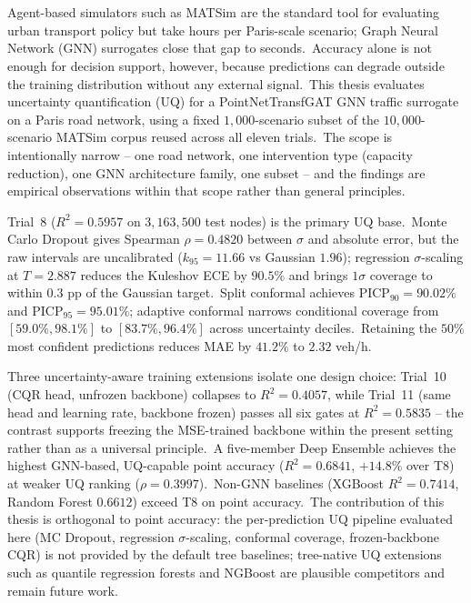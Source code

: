 \chapter{\abstractname}

Agent-based simulators such as MATSim are the standard tool for evaluating urban transport policy but take hours per Paris-scale scenario; Graph Neural Network (GNN) surrogates close that gap to seconds.\ Accuracy alone is not enough for decision support, however, because predictions can degrade outside the training distribution without any external signal.\ This thesis evaluates uncertainty quantification (UQ) for a PointNetTransfGAT GNN traffic surrogate on a Paris road network, using a fixed $1{,}000$-scenario subset of the $10{,}000$-scenario MATSim corpus reused across all eleven trials.\ The scope is intentionally narrow -- one road network, one intervention type (capacity reduction), one GNN architecture family, one subset -- and the findings are empirical observations within that scope rather than general principles.

Trial~8 ($R^2 = 0.5957$ on $3{,}163{,}500$ test nodes) is the primary UQ base.\ Monte Carlo Dropout gives Spearman $\rho = 0.4820$ between $\sigma$ and absolute error, but the raw intervals are uncalibrated ($k_{95} = 11.66$ vs Gaussian $1.96$); regression $\sigma$-scaling at $T = 2.887$ reduces the Kuleshov ECE by $90.5\%$ and brings $1\sigma$ coverage to within $0.3$ pp of the Gaussian target.\ Split conformal achieves $\mathrm{PICP}_{90} = 90.02\%$ and $\mathrm{PICP}_{95} = 95.01\%$; adaptive conformal narrows conditional coverage from $[59.0\%, 98.1\%]$ to $[83.7\%, 96.4\%]$ across uncertainty deciles.\ Retaining the $50\%$ most confident predictions reduces MAE by $41.2\%$ to $2.32$ veh/h.

Three uncertainty-aware training extensions isolate one design choice: Trial~10 (CQR head, unfrozen backbone) collapses to $R^2 = 0.4057$, while Trial~11 (same head and learning rate, backbone frozen) passes all six gates at $R^2 = 0.5835$ -- the contrast supports freezing the MSE-trained backbone within the present setting rather than as a universal principle.\ A five-member Deep Ensemble achieves the highest GNN-based, UQ-capable point accuracy ($R^2 = 0.6841$, $+14.8\%$ over T8) at weaker UQ ranking ($\rho = 0.3997$).\ Non-GNN baselines (XGBoost $R^2 = 0.7414$, Random Forest $0.6612$) exceed T8 on point accuracy.\ The contribution of this thesis is orthogonal to point accuracy: the per-prediction UQ pipeline evaluated here (MC Dropout, regression $\sigma$-scaling, conformal coverage, frozen-backbone CQR) is not provided by the default tree baselines; tree-native UQ extensions such as quantile regression forests and NGBoost are plausible competitors and remain future work.
